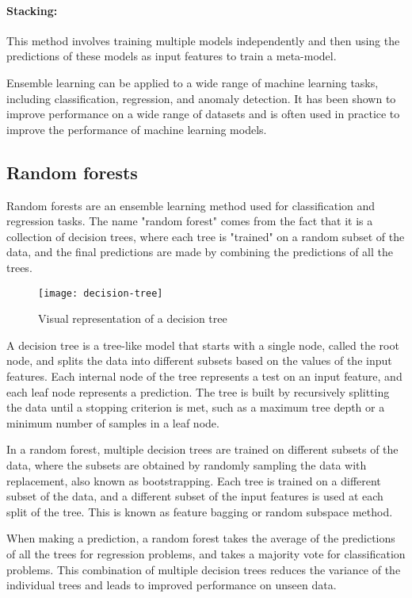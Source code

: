 \paragraph{Stacking:} This method involves training multiple models independently and then using the predictions of these models as input features to train a meta-model.

Ensemble learning can be applied to a wide range of machine learning tasks, including classification, regression, and anomaly detection. It has been shown to improve performance on a wide range of datasets and is often used in practice to improve the performance of machine learning models.


\subsection{Random forests}

Random forests \cite{breiman2001random, charles2020random} are an ensemble learning method used for classification and regression tasks. The name "random forest" comes from the fact that it is a collection of decision trees, where each tree is "trained" on a random subset of the data, and the final predictions are made by combining the predictions of all the trees.

\begin{figure}[H]
  \centering
  \texttt{[image: decision-tree]}
  \caption{Visual representation of a decision tree \cite{scikit}}
\end{figure}

A decision tree is a tree-like model that starts with a single node, called the root node, and splits the data into different subsets based on the values of the input features. Each internal node of the tree represents a test on an input feature, and each leaf node represents a prediction. The tree is built by recursively splitting the data until a stopping criterion is met, such as a maximum tree depth or a minimum number of samples in a leaf node.

In a random forest, multiple decision trees are trained on different subsets of the data, where the subsets are obtained by randomly sampling the data with replacement, also known as bootstrapping. Each tree is trained on a different subset of the data, and a different subset of the input features is used at each split of the tree. This is known as feature bagging or random subspace method.

When making a prediction, a random forest takes the average of the predictions of all the trees for regression problems, and takes a majority vote for classification problems. This combination of multiple decision trees reduces the variance of the individual trees and leads to improved performance on unseen data.

